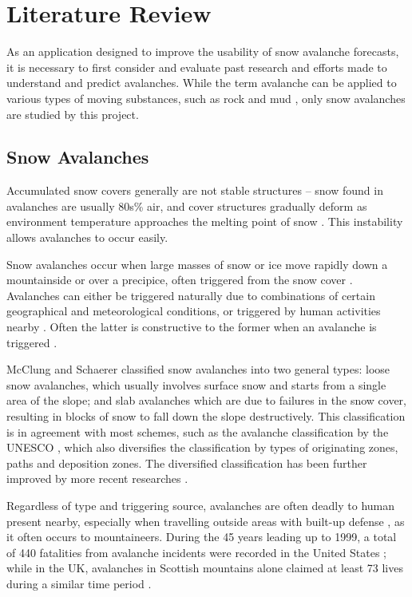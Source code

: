 \documentclass[openany]{UoYCSproject}
\begin{document}
\chapter{Literature Review} \label{ch:lit-review}

As an application designed to improve the usability of snow avalanche forecasts, it is necessary to first consider and evaluate past research and efforts made to understand and predict avalanches. While the term avalanche can be applied to various types of moving substances, such as rock and mud \cite[p. 1]{91097820150101}, only snow avalanches are studied by this project.

\section{Snow Avalanches}

Accumulated snow covers generally are not stable structures -- snow found in avalanches are usually 80s\% air, and cover structures gradually deform as environment temperature approaches the melting point of snow \cite[p. 16]{mcclung2006avalanche}. This instability allows avalanches to occur easily.

Snow avalanches occur when large masses of snow or ice move rapidly down a mountainside or over a precipice, often triggered from the snow cover \cite[p. 1]{91097820150101}. Avalanches can either be triggered naturally due to combinations of certain geographical \cite[p. 17]{91097820150101} and meteorological \cite[p. 23]{91097820150101} conditions, or triggered by human activities nearby \cite{schweizer2001characteristics}. Often the latter is constructive to the former when an avalanche is triggered \cite[p. 17]{mcclung2006avalanche}\cite[p .48]{scottish-avalanches}.

McClung and Schaerer \cite[p. 73]{mcclung2006avalanche} classified snow avalanches into two general types: loose snow avalanches, which usually involves surface snow and starts from a single area of the slope; and slab avalanches which are due to failures in the snow cover, resulting in blocks of snow to fall down the slope destructively. This classification is in agreement with most schemes, such as the avalanche classification by the UNESCO \cite{unesco-avalanche}, which also diversifies the classification by types of originating zones, paths and deposition zones. The diversified classification has been further improved by more recent researches \cite{91097820150101}.

Regardless of type and triggering source, avalanches are often deadly to human present nearby, especially when travelling outside areas with built-up defense \cite{91097820150101}, as it often occurs to mountaineers. During the 45 years leading up to 1999, a total of 440 fatalities from avalanche incidents were recorded in the United States \cite{PAGE1999146}; while in the UK, avalanches in Scottish mountains alone claimed at least 73 lives during a similar time period \cite{scottish-avalanches}. 
\end{document}
